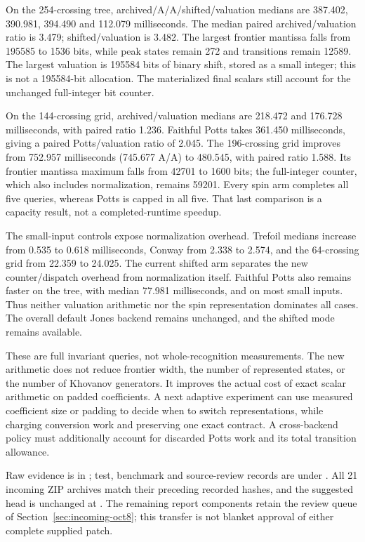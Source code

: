 On the 254-crossing tree, archived/A/A/shifted/valuation medians are
387.402, 390.981, 394.490 and 112.079 milliseconds. The median paired
archived/valuation ratio is 3.479; shifted/valuation is 3.482. The largest
frontier mantissa falls from 195585 to 1536 bits, while peak states remain
272 and transitions remain 12589. The largest valuation is 195584 bits of
binary shift, stored as a small integer; this is not a 195584-bit allocation.
The materialized final scalars still account for the unchanged full-integer
bit counter.

On the 144-crossing grid, archived/valuation medians are 218.472 and
176.728 milliseconds, with paired ratio 1.236. Faithful Potts takes
361.450 milliseconds, giving a paired Potts/valuation ratio of 2.045.
The 196-crossing grid improves from 752.957 milliseconds (745.677 A/A)
to 480.545, with paired ratio 1.588. Its frontier mantissa maximum falls
from 42701 to 1600 bits; the full-integer counter, which also includes
normalization, remains 59201. Every spin arm completes all five queries,
whereas Potts is capped in all five. That last comparison is a capacity
result, not a completed-runtime speedup.

The small-input controls expose normalization overhead. Trefoil medians
increase from 0.535 to 0.618 milliseconds, Conway from 2.338 to 2.574,
and the 64-crossing grid from 22.359 to 24.025. The current shifted arm
separates the new counter/dispatch overhead from normalization itself.
Faithful Potts also remains faster on the tree, with median 77.981
milliseconds, and on most small inputs. Thus neither valuation arithmetic
nor the spin representation dominates all cases. The overall default Jones
backend remains unchanged, and the shifted mode remains available.

These are full invariant queries, not whole-recognition measurements. The
new arithmetic does not reduce frontier width, the number of represented
states, or the number of Khovanov generators. It improves the actual cost
of exact scalar arithmetic on padded coefficients. A next adaptive experiment
can use measured coefficient size or padding to decide when to switch
representations, while charging conversion work and preserving one exact
contract. A cross-backend policy must additionally account for discarded
Potts work and its total transition allowance.

Raw evidence is in ; test,
benchmark and source-review records are under .
All 21 incoming ZIP archives match their preceding recorded hashes, and the
suggested  head is unchanged at . The
remaining report components retain the review queue of
Section~\ref{sec:incoming-oct8}; this transfer is not blanket approval of
either complete supplied patch.
